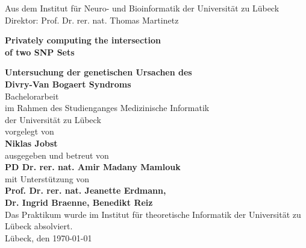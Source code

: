 
\addtolength{\topmargin}{-1.2cm} 
\addtolength{\textwidth}{2.35cm} 

\vspace*{-2.7cm}


\vspace*{0.4cm}
\begin{center}


\enlargethispage{5cm}
Aus dem Institut f\"ur
Neuro- und Bioinformatik
der Universit\"at zu L\"ubeck\\
Direktor: Prof. Dr. rer. nat. Thomas Martinetz\\[1.8cm]
%

\begin{large}
\textcolor{Ocean}{{\textbf {Privately computing the intersection } }}\\ %
\textcolor{Ocean}{{\textbf {of two SNP Sets} }}\\ %
\end{large}
\vspace*{1.5cm}
%
{{\textbf{Untersuchung der genetischen  Ursachen des } }}\\ %
{{\textbf {Divry-Van Bogaert Syndroms} }}\\ %
\vspace*{2cm}
%
Bachelorarbeit\\ 
im Rahmen des Studienganges Medizinische Informatik\\
der Universit\"at zu L\"ubeck\\[1.0cm]
%
vorgelegt von\\[0.1cm]
\textbf{Niklas Jobst}\\[1.0cm]
%
ausgegeben und betreut von\\[0.1cm]
\textbf{PD Dr. rer. nat. Amir Madany Mamlouk}\\[0.3cm]
mit Unterst\"utzung von\\[0.1cm]
\textbf{Prof. Dr. rer. nat. Jeanette Erdmann,\\ Dr. Ingrid Braenne, Benedikt Reiz}\\[1.8cm]
Das Praktikum wurde im Institut für theoretische Informatik der Universit\"at zu L\"ubeck absolviert.
%
\\[2.2cm]

L\"ubeck, den \today
\end{center}
  
